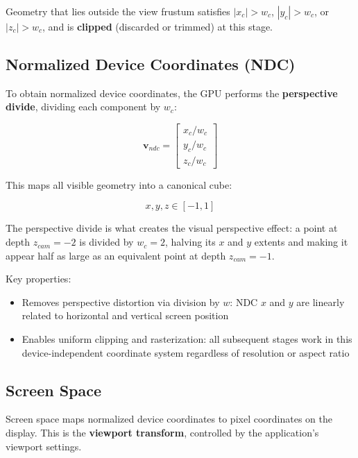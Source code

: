 \documentclass[11pt]{article}
\begin{document}
Geometry that lies outside the view frustum satisfies $|x_c| > w_c$, $|y_c| > w_c$, or $|z_c| > w_c$, and is \textbf{clipped} (discarded or trimmed) at this stage.

\subsection{Normalized Device Coordinates (NDC)}

To obtain normalized device coordinates, the GPU performs the \textbf{perspective divide}, dividing each component by $w_c$:

\begin{equation}
    \mathbf{v}_{ndc} =
    \begin{bmatrix}
        x_c / w_c \\
        y_c / w_c \\
        z_c / w_c
    \end{bmatrix}
\end{equation}

This maps all visible geometry into a canonical cube:

\begin{equation}
    x, y, z \in [-1, 1]
\end{equation}

The perspective divide is what creates the visual perspective effect: a point at depth $z_{cam} = -2$ is divided by $w_c = 2$, halving its $x$ and $y$ extents and making it appear half as large as an equivalent point at depth $z_{cam} = -1$.

Key properties:

\begin{itemize}
    \item Removes perspective distortion via division by $w$: NDC $x$ and $y$ are linearly related to horizontal and vertical screen position
    \item Enables uniform clipping and rasterization: all subsequent stages work in this device-independent coordinate system regardless of resolution or aspect ratio
\end{itemize}


\subsection{Screen Space}

Screen space maps normalized device coordinates to pixel coordinates on the display. This is the \textbf{viewport transform}, controlled by the application's viewport settings.
\end{document}
